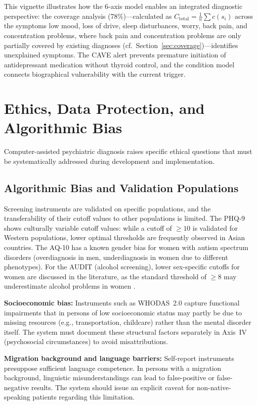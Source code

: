 \documentclass[11pt,a4paper]{article}
\begin{document}
\noindent This vignette illustrates how the 6-axis model enables an integrated diagnostic perspective: the coverage analysis (78\%)---calculated as $C_{\text{total}} = \frac{1}{n} \sum c(s_i)$ across the symptoms low mood, loss of drive, sleep disturbances, worry, back pain, and concentration problems, where back pain and concentration problems are only partially covered by existing diagnoses (cf.\ Section~\ref{sec:coverage})---identifies unexplained symptoms. The CAVE alert prevents premature initiation of antidepressant medication without thyroid control, and the condition model connects biographical vulnerability with the current trigger.

\section{Ethics, Data Protection, and Algorithmic Bias}
\label{sec:ethics}

Computer-assisted psychiatric diagnosis raises specific ethical questions that must be systematically addressed during development and implementation.

\subsection{Algorithmic Bias and Validation Populations}

Screening instruments are validated on specific populations, and the transferability of their cutoff values to other populations is limited. The PHQ-9 shows culturally variable cutoff values: while a cutoff of $\geq 10$ is validated for Western populations, lower optimal thresholds are frequently observed in Asian countries. The AQ-10 has a known gender bias for women with autism spectrum disorders (overdiagnosis in men, underdiagnosis in women due to different phenotypes). For the AUDIT (alcohol screening), lower sex-specific cutoffs for women are discussed in the literature, as the standard threshold of $\geq 8$ may underestimate alcohol problems in women \citep{Saunders1993}.

\textbf{Socioeconomic bias:} Instruments such as WHODAS~2.0 capture functional impairments that in persons of low socioeconomic status may partly be due to missing resources (e.g., transportation, childcare) rather than the mental disorder itself. The system must document these structural factors separately in Axis~IV (psychosocial circumstances) to avoid misattributions.

\textbf{Migration background and language barriers:} Self-report instruments presuppose sufficient language competence. In persons with a migration background, linguistic misunderstandings can lead to false-positive or false-negative results. The system should issue an explicit caveat for non-native-speaking patients regarding this limitation.
\end{document}
